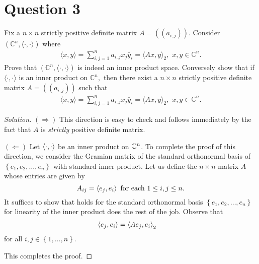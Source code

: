 \section{Question 3}
\horz
Fix a $n\times n$ strictly positive definite matrix $A= (\!\!( a_{i,j})\!\!).$ Consider $(\mathbb C^n, \langle \cdot, \cdot \rangle)$ where 
\begin{align*}
\langle x, y \rangle = \sum\limits_{i,j=1}^n a_{i,j}x_j \bar{y}_i = \langle Ax,y\rangle_2,\,\,x,y\in \mathbb C^n.
\end{align*}
Prove that  $(\mathbb C^n, \langle \cdot, \cdot \rangle)$ is indeed an inner product space. Conversely show that if $\langle \cdot, \cdot \rangle$ is an inner product on $\mathbb C^n,$ then there exist a $n\times n$ strictly  positive definite matrix $A= (\!\!( a_{i,j})\!\!)$ such that \begin{align*}
    \langle x, y \rangle = \sum\limits_{i,j=1}^n a_{i,j}x_j \bar{y}_i = \langle Ax,y\rangle_2,\,\,x,y\in \mathbb C^n. \label{eqn:q3}
\end{align*}
\horz

\begin{proof}[Solution]
    $(\Longrightarrow)$ This direction is easy to check and follows immediately by the fact that $A$ is \textit{strictly} positive definite matrix.
    
    $(\Longleftarrow)$ Let $\left\langle \cdot , \cdot \right\rangle$ be an inner product on $\mathbb C ^{n}$. To complete the proof of this direction, we consider the Gramian matrix of the standard orthonormal basis of $\left\{ e_{1}, e_{2}, \ldots , e_{n} \right\}$ with standard inner product. Let us define the $n\times n$ matrix $A$ whose entries are given by
    \begin{equation*}
	A_{ij}= \left\langle e_{j}, e_{i} \right\rangle \text{ for each } 1 \le i,j \le n \text{.}
    \end{equation*}
    It suffices to show that \label{eqn:q3} holds for the standard orthonormal basis $\left\{ e_{1}, e_{2} , \ldots , e_{n} \right\}$ for linearity of the inner product does the rest of the job. Observe that
    \begin{align*}
	\left\langle e_{j}, e_{i} \right\rangle &= \left\langle A{e_{j}}, e_{i} \right\rangle_{2} 
    \end{align*}
    for all $i,j \in \left\{ 1, \ldots , n \right\}$.
    

    This completes the proof.
\end{proof}
